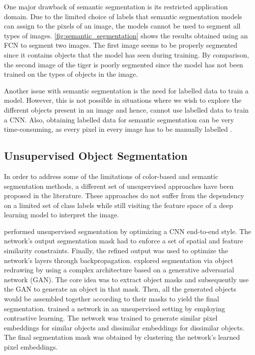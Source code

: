 One major drawback of semantic segmentation is its restricted application domain. Due to the limited choice of labels that semantic segmentation models can assign to the pixels of an image, the models cannot be used to segment all types of images. \autoref{fig:semantic_segmentation} shows the results obtained using an FCN to segment two images. The first image seems to be properly segmented since it contains objects that the model has seen during training. By comparison, the second image of the tiger is poorly segmented since the model has not been trained on the types of objects in the image. 

Another issue with semantic segmentation is the need for labelled data to train a model. However, this is not possible in situations where we wish to explore the different objects present in an image and hence, cannot use labelled data to train a CNN. Also, obtaining labelled data for semantic segmentation can be very time-consuming, as every pixel in every image has to be manually labelled \parencite{chen2019unsupervised}.

\subsection{Unsupervised Object Segmentation}

In order to address some of the limitations of color-based and semantic segmentation methods, a different set of unsupervised approaches have been proposed in the literature. These approaches do not suffer from the dependency on a limited set of class labels while still visiting the feature space of a deep learning model to interpret the image.

\textcite{kanezaki2018unsupervised} performed unsupervised segmentation by optimizing a CNN end-to-end style. The network's output segmentation mask had to enforce a set of spatial and feature similarity constraints. Finally, the refined output was used to optimize the network's layers through backpropagation. \textcite{chen2019unsupervised} explored segmentation via object redrawing by using a complex architecture based on a generative adversarial network (GAN). The core idea was to extract object masks and subsequently use the GAN to generate an object in that mask. Then, all the generated objects would be assembled together according to their masks to yield the final segmentation. \textcite{van2021unsupervised} trained a network in an unsupervised setting by employing contrastive learning. The network was trained to generate similar pixel embeddings for similar objects and dissimilar embeddings for dissimilar objects. The final segmentation mask was obtained by clustering the network's learned pixel embeddings.

